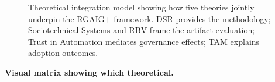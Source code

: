 \begin{figure}[!htbp]
{}
\caption[Theoretical Integration: DSR → RGAIG+ → Trust → TAM]{Theoretical integration model showing how five theories jointly underpin the RGAIG+ framework. DSR provides the methodology; Sociotechnical Systems and RBV frame the artifact evaluation; Trust in Automation mediates governance effects; TAM explains adoption outcomes.}
\label{fig:rgaig_theoretical_integration}
\end{figure}

\noindent\textbf{Visual matrix showing which theoretical.}

